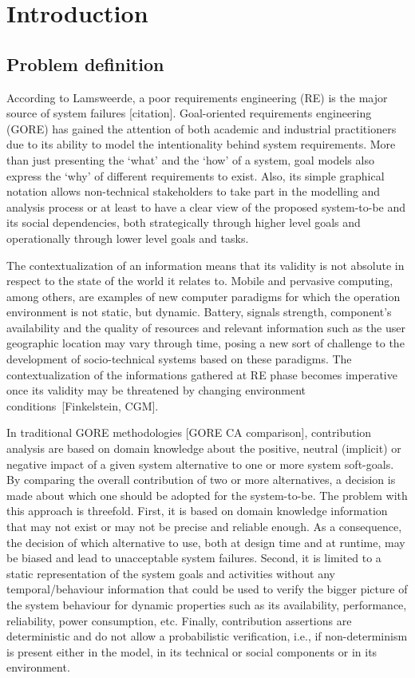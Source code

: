 \chapter{Introduction}\label{ch_introduction}%

\section{Problem definition}

According to Lamsweerde, a poor requirements engineering (RE) is the major source of system failures [citation]. Goal-oriented requirements engineering (GORE) has gained the attention of both academic and industrial practitioners due to its ability to model the intentionality behind system requirements. More than just presenting the `what' and the `how' of a system, goal models also express the `why' of different requirements to exist. Also, its simple graphical notation allows non-technical stakeholders to take part in the modelling and analysis process or at least to have a clear view of the proposed system-to-be and its social dependencies, both strategically through higher level goals and operationally through lower level goals and tasks. 

The contextualization of an information means that its validity is not absolute in respect to the state of the world it relates to. Mobile and pervasive computing, among others, are examples of new computer paradigms for which the operation environment is not static, but dynamic. Battery, signals strength, component's availability and the quality of resources and relevant information such as the user geographic location may vary through time, posing a new sort of challenge to the development of socio-technical systems based on these paradigms. The contextualization of the informations gathered at RE phase becomes imperative once its validity may be threatened by changing environment conditions~[Finkelstein, CGM]. 

In traditional GORE methodologies [GORE CA comparison], contribution  analysis are based on domain knowledge about the positive, neutral (implicit) or negative impact of a given system alternative to one or more system soft-goals. By  comparing the overall contribution of two or more alternatives, a decision is made about which one should be adopted for the system-to-be. The problem with this approach is threefold. First, it is based on domain knowledge information that may not exist or may not be precise and reliable enough. As a consequence, the decision of which alternative to use, both at design time and at runtime, may be biased and lead to unacceptable system failures. Second, it is limited to a static representation of the system goals and activities without any temporal/behaviour information that could be used to verify the bigger picture of the system behaviour for dynamic properties such as its availability, performance, reliability, power consumption, etc. Finally, contribution assertions are deterministic and do not allow a probabilistic verification, i.e., if non-determinism is present either in the model, in its technical or social components or in its environment.

